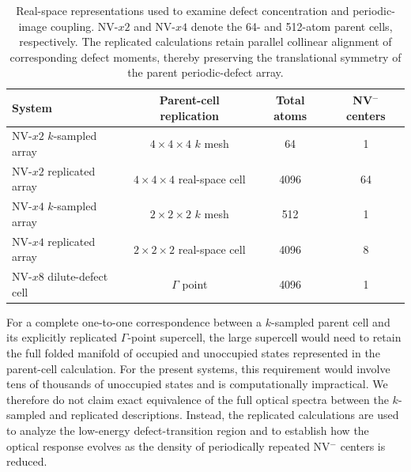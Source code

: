 \begin{table}[ht!]
\caption{\label{tab:nv-defect-arrays}
Real-space representations used to examine defect concentration and
periodic-image coupling.  NV-$x2$ and NV-$x4$ denote the 64- and
512-atom parent cells, respectively.  The replicated calculations
retain parallel collinear alignment of corresponding defect moments,
thereby preserving the translational symmetry of the parent
periodic-defect array.}
\centering
\begin{tabular}{lccc}
\hline
System & Parent-cell replication & Total atoms & NV$^-$ centers \\
\hline
NV-$x2$ $k$-sampled array & $4 \times 4 \times 4$ $k$ mesh & 64 & 1 \\
NV-$x2$ replicated array & $4 \times 4 \times 4$ real-space cell & 4096 & 64 \\
NV-$x4$ $k$-sampled array & $2 \times 2 \times 2$ $k$ mesh & 512 & 1 \\
NV-$x4$ replicated array & $2 \times 2 \times 2$ real-space cell & 4096 & 8 \\
NV-$x8$ dilute-defect cell & $\Gamma$ point & 4096 & 1 \\
\hline
\end{tabular}
\end{table}

For a complete one-to-one correspondence between a $k$-sampled parent
cell and its explicitly replicated $\Gamma$-point supercell, the
large supercell would need to retain the full folded manifold of
occupied and unoccupied states represented in the parent-cell
calculation.  For the present systems, this requirement would involve
tens of thousands of unoccupied states and is computationally
impractical.  We therefore do not claim exact equivalence of the full
optical spectra between the $k$-sampled and replicated descriptions.
Instead, the replicated calculations are used to analyze the
low-energy defect-transition region and to establish how the optical
response evolves as the density of periodically repeated NV$^-$
centers is reduced.


